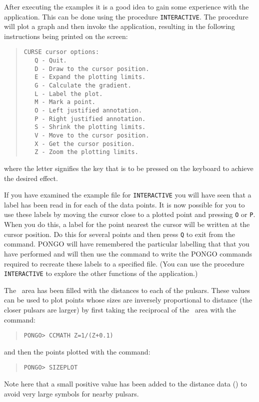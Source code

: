 After executing the examples it is a good idea to gain some
experience with the  application.  This can be done
using the procedure \verb+INTERACTIVE+.  The procedure will plot a
graph and then invoke the  application, resulting
in the following instructions being printed on the screen:
\begin{quote}
\begin{verbatim}
CURSE cursor options:
   Q - Quit.
   D - Draw to the cursor position.
   E - Expand the plotting limits.
   G - Calculate the gradient.
   L - Label the plot.
   M - Mark a point.
   O - Left justified annotation.
   P - Right justified annotation.
   S - Shrink the plotting limits.
   V - Move to the cursor position.
   X - Get the cursor position.
   Z - Zoom the plotting limits.
\end{verbatim}
\end{quote}
where the letter signifies the key that is to be pressed on the keyboard to
achieve the desired effect.

If you have examined the example file for \verb+INTERACTIVE+ you will
have seen that a label has been read in for each of the data points.
It is now possible for you to use these labels by moving the cursor close to a
plotted point and pressing \verb+O+ or \verb+P+.
When you do this, a label for the point nearest the cursor will be written at
the cursor position.
Do this for several points and then press \verb+Q+ to exit from the
 command.
PONGO will have remembered the particular labelling that that you have
performed and will then use the command  to
write the PONGO commands required to recreate these labels to a
specified file.  (You can use the procedure \verb+INTERACTIVE+ to
explore the other functions of the  application.)

The \zcol\ area has been filled with the distances to each of the
pulsars.
These values can be used to plot points whose sizes are inversely proportional
to distance (\ie the closer pulsars are larger) by first taking the reciprocal
of the \zcol\ area with the  command:
\begin{quote}
\begin{verbatim}
PONGO> CCMATH Z=1/(Z+0.1)
\end{verbatim}
\end{quote}
and then the points plotted with the command:
\begin{quote}
\begin{verbatim}
PONGO> SIZEPLOT
\end{verbatim}
\end{quote}
Note here that a small positive value has been added to the distance data
() to avoid very large symbols for nearby pulsars.


